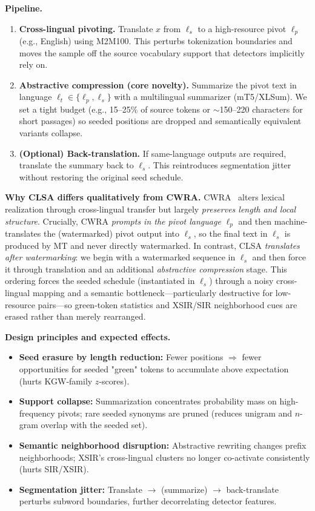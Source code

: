 \documentclass{article}
\begin{document}
\textbf{Pipeline.}
\begin{enumerate}
    \item \textbf{Cross-lingual pivoting.} Translate $x$ from $\ell_s$ to a high-resource pivot $\ell_p$ (e.g., English) using M2M100. This perturbs tokenization boundaries and moves the sample off the source vocabulary support that detectors implicitly rely on.
    \item \textbf{Abstractive compression (core novelty).} Summarize the pivot text in language $\ell_t\!\in\!\{\ell_p,\ell_s\}$ with a multilingual summarizer (mT5/XLSum). We set a tight budget (e.g., 15--25\% of source tokens or $\sim$150--220 characters for short passages) so seeded positions are dropped and semantically equivalent variants collapse.
    \item \textbf{(Optional) Back-translation.} If same-language outputs are required, translate the summary back to $\ell_s$. This reintroduces segmentation jitter without restoring the original seed schedule.
\end{enumerate}

\textbf{Why CLSA differs qualitatively from CWRA.}
CWRA~\citep{He2024cwra} alters lexical realization through cross-lingual transfer but largely \emph{preserves length and local structure}. Crucially, CWRA \emph{prompts in the pivot language} $\ell_p$ and then machine-translates the (watermarked) pivot output into $\ell_s$, so the final text in $\ell_s$ is produced by MT and never directly watermarked. In contrast, CLSA \emph{translates after watermarking}: we begin with a watermarked sequence in $\ell_s$ and then force it through translation and an additional \emph{abstractive compression} stage. This ordering forces the seeded schedule (instantiated in $\ell_s$) through a noisy cross-lingual mapping and a semantic bottleneck—particularly destructive for low-resource pairs—so green-token statistics and XSIR/SIR neighborhood cues are erased rather than merely rearranged.

\textbf{Design principles and expected effects.}
\begin{itemize}
    \item \textbf{Seed erasure by length reduction:} Fewer positions $\Rightarrow$ fewer opportunities for seeded "green" tokens to accumulate above expectation (hurts KGW-family $z$-scores).
    \item \textbf{Support collapse:} Summarization concentrates probability mass on high-frequency pivots; rare seeded synonyms are pruned (reduces unigram and $n$-gram overlap with the seeded set).
    \item \textbf{Semantic neighborhood disruption:} Abstractive rewriting changes prefix neighborhoods; XSIR's cross-lingual clusters no longer co-activate consistently (hurts SIR/XSIR).
    \item \textbf{Segmentation jitter:} Translate $\rightarrow$ (summarize) $\rightarrow$ back-translate perturbs subword boundaries, further decorrelating detector features.
\end{itemize}
\end{document}
